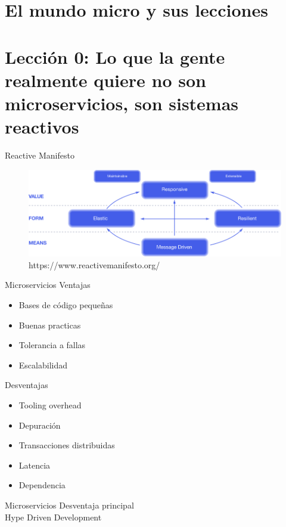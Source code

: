 \documentclass{beamer}
\begin{document}
\section{El mundo micro y sus lecciones}

\section{Lección 0: Lo que la gente realmente quiere no son microservicios, son sistemas reactivos}
\begin{frame}{Reactive Manifesto}
\begin{figure}
	\centering
	\includegraphics[width=0.9\linewidth]{Images/reactive-traits}
	\caption{https://www.reactivemanifesto.org/}
\end{figure}
\end{frame}

\begin{frame}{Microservicios}
Ventajas
\begin{itemize}
\item Bases de código pequeñas
\item Buenas practicas
\item Tolerancia a fallas
\item Escalabilidad
\end{itemize}
Desventajas
\begin{itemize}
\item Tooling overhead
\item Depuración
\item Transacciones distribuidas
\item Latencia
\item Dependencia
\end{itemize}
\end{frame}


\begin{frame}{Microservicios}
Desventaja principal \\

\huge Hype Driven Development
\end{frame}
\end{document}
